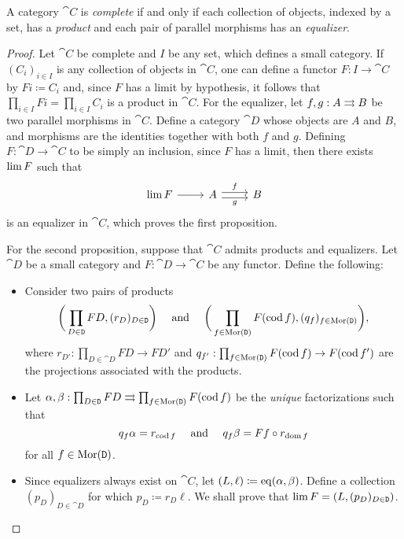 \begin{theorem}
    \label{thm:complete-category-prod-eq}
    A category \(\cat C\) is \emph{complete} if and only if each collection of
    objects, indexed by a set, has a \emph{product} and each pair of parallel
    morphisms has an \emph{equalizer}.
\end{theorem}

\begin{proof}
    Let \(\cat C\) be complete and \(I\) be any set, which defines a small
    category. If \((C_i)_{i \in I}\) is any collection of objects in \(\cat C\), one
    can define a functor \(F: I \to \cat C\) by \(F i \coloneq C_i\) and, since
    \(F\) has a limit by hypothesis, it follows that
    \(\prod_{i \in I} F i = \prod_{i \in I} C_i\) is a product in \(\cat C\). For
    the equalizer, let \(f, g: A \rightrightarrows B\) be two parallel morphisms in \(\cat
    C\). Define a category \(\cat D\) whose objects are \(A\) and \(B\), and
    morphisms are the identities together with both \(f\) and \(g\). Defining \(F:
    \cat D \to \cat C\) to be simply an inclusion, since \(F\) has a limit, then
    there exists \(\operatorname{lim} F\) such that
    \[
        \begin{tikzcd}
            \Lim F \ar[r] &A \ar[r, shift left, "f"] \ar[r, shift right, "g"']
            &B
        \end{tikzcd}
    \]
    is an equalizer in \(\cat C\), which proves the first proposition.

    For the second proposition, suppose that \(\cat C\) admits products and
    equalizers. Let \(\cat D\) be a small category and \(F: \cat D \to \cat C\) be
    any functor. Define the following:

    \begin{itemize}\setlength\itemsep{0em}
        \item Consider two pairs of products
              \[
                  \bigg(\prod_{D \in \texttt D} F D, (r_D)_{D \in \texttt D}\bigg)
                  \quad\text{ and }\quad
                  \bigg(\prod_{f \in \operatorname{Mor}(\texttt D)} F(\operatorname{cod} f),
                  (q_f)_{f \in \operatorname{Mor}(\texttt D)}\bigg),
              \]
              where \(r_{D'}: \prod_{D \in \cat D} F D \to F D'\) and
              \(q_{f'}: \prod_{f \in \operatorname{Mor}(\texttt D)} F (\operatorname{cod} f) \to F (\operatorname{cod} f')\) are the
              projections associated with the products.

        \item Let
              \(\alpha, \beta: \prod_{D \in \texttt D} F D \rightrightarrows \prod_{f \in \operatorname{Mor}(\texttt D)} F
              (\operatorname{cod} f)\) be the \emph{unique} factorizations such that
              \[
                  q_f \alpha = r_{\operatorname{cod} f}
                  \quad\text{ and }\quad
                  q_f \beta = F f \circ r_{\operatorname{dom} f}
              \]
              for all \(f \in \operatorname{Mor}(\texttt D)\).
        \item Since equalizers always exist on \(\cat C\), let
              \((L, \ell) \coloneq \operatorname{eq}(\alpha, \beta)\). Define a collection
              \((p_D)_{D \in \cat D}\) for which \(p_D \coloneq r_D \ell\). We shall prove
              that \(\operatorname{lim} F = (L, (p_D)_{D \in \texttt D})\).
    \end{itemize}


\end{proof}
